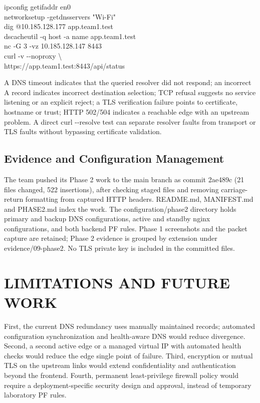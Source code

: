 \documentclass[conference]{IEEEtran}
\begin{document}
ipconfig getifaddr en0\\
networksetup -getdnsservers "Wi-Fi"\\
dig @10.185.128.177 app.team1.test\\
dscacheutil -q host -a name app.team1.test\\
nc -G 3 -vz 10.185.128.147 8443\\
curl -v -\/-noproxy \textquotesingle*\textquotesingle{}
\textbackslash{}\\
https://app.team1.test:8443/api/status

A DNS timeout indicates that the queried resolver did not respond; an
incorrect A record indicates incorrect destination selection; TCP
refusal suggests no service listening or an explicit reject; a TLS
verification failure points to certificate, hostname or trust; HTTP
502/504 indicates a reachable edge with an upstream problem. A direct
curl -\/-resolve test can separate resolver faults from transport or TLS
faults without bypassing certificate validation.

\subsection{Evidence and Configuration
Management}\label{c.-evidence-and-configuration-management}

The team pushed its Phase 2 work to the main branch as commit 2ae489c
(21 files changed, 522 insertions), after checking staged files and
removing carriage-return formatting from captured HTTP headers.
README.md, MANIFEST.md and PHASE2.md index the work. The
configuration/phase2 directory holds primary and backup DNS
configurations, active and standby nginx configurations, and both
backend PF rules. Phase 1 screenshots and the packet capture are
retained; Phase 2 evidence is grouped by extension under
evidence/09-phase2. No TLS private key is included in the committed
files.

\section{LIMITATIONS AND FUTURE
WORK}\label{vii.-limitations-and-future-work}

First, the current DNS redundancy uses manually maintained records;
automated configuration synchronization and health-aware DNS would
reduce divergence. Second, a second active edge or a managed virtual IP
with automated health checks would reduce the edge single point of
failure. Third, encryption or mutual TLS on the upstream links would
extend confidentiality and authentication beyond the frontend. Fourth,
permanent least-privilege firewall policy would require a
deployment-specific security design and approval, instead of temporary
laboratory PF rules.
\end{document}
